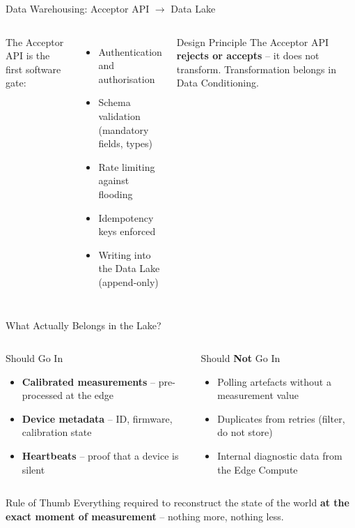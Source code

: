 \documentclass[aspectratio=169]{beamer}
\begin{document}
\begin{frame}{Data Warehousing: Acceptor API $\rightarrow$ Data Lake}
  \begin{columns}
      The Acceptor API is the first software gate:
      \begin{itemize}
        \item Authentication and authorisation
        \item Schema validation (mandatory fields, types)
        \item Rate limiting against flooding
        \item Idempotency keys enforced
        \item Writing into the Data Lake (append-only)
      \end{itemize}
      \begin{exampleblock}{Design Principle}
        The Acceptor API \textbf{rejects or accepts} –
        it does not transform.
        Transformation belongs in Data Conditioning.
      \end{exampleblock}
  \end{columns}
\end{frame}

\begin{frame}{What Actually Belongs in the Lake?}
  \begin{columns}
      \begin{block}{Should Go In}
        \begin{itemize}
          \item \textbf{Calibrated measurements} – pre-processed at the edge
          \item \textbf{Device metadata} – ID, firmware, calibration state
          \item \textbf{Heartbeats} – proof that a device is silent
        \end{itemize}
      \end{block}
      \begin{alertblock}{Should \textbf{Not} Go In}
        \begin{itemize}
          \item Polling artefacts without a measurement value
          \item Duplicates from retries (filter, do not store)
          \item Internal diagnostic data from the Edge Compute
        \end{itemize}
      \end{alertblock}
  \end{columns}
  \vspace{0.5em}
  \begin{exampleblock}{Rule of Thumb}
    Everything required to reconstruct the state of the world
    \textbf{at the exact moment of measurement} – nothing more, nothing less.
  \end{exampleblock}
\end{frame}
\end{document}

